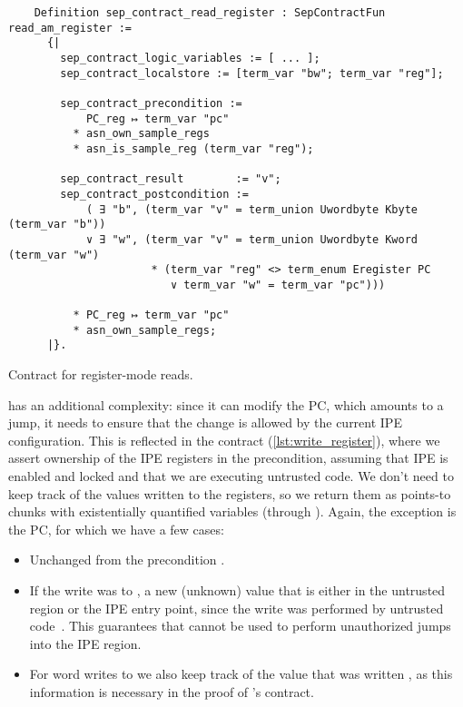 \begin{listing}
  \begin{verbatim}
    Definition sep_contract_read_register : SepContractFun read_am_register :=
      {|
        sep_contract_logic_variables := [ ... ];
        sep_contract_localstore := [term_var "bw"; term_var "reg"];

        sep_contract_precondition :=
            PC_reg ↦ term_var "pc"
          * asn_own_sample_regs
          * asn_is_sample_reg (term_var "reg");

        sep_contract_result        := "v";
        sep_contract_postcondition :=
            ( ∃ "b", (term_var "v" = term_union Uwordbyte Kbyte (term_var "b"))
            ∨ ∃ "w", (term_var "v" = term_union Uwordbyte Kword (term_var "w")
                      * (term_var "reg" <> term_enum Eregister PC
                         ∨ term_var "w" = term_var "pc")))

          * PC_reg ↦ term_var "pc"
          * asn_own_sample_regs;
      |}.
  \end{verbatim}
  \caption{Contract for register-mode reads.}
  \label{lst:read_register}
\end{listing}

 has an additional complexity: since it can modify the PC, which amounts to a jump, it needs to ensure that the change is allowed by the current IPE configuration. This is reflected in the contract (\cref{lst:write_register}), where we assert ownership of the IPE registers in the precondition, assuming that IPE is enabled and locked and that we are executing untrusted code. We don't need to keep track of the values written to the registers, so we return them as points-to chunks with existentially quantified variables (through ). Again, the exception is the PC, for which we have a few cases:
\begin{itemize}
\item Unchanged from the precondition .
\item If the write was to , a new (unknown) value that is either in the untrusted region or the IPE entry point, since the write was performed by untrusted code~. This guarantees that  cannot be used to perform unauthorized jumps into the IPE region.
\item For word writes to  we also keep track of the value that was written , as this information is necessary in the proof of 's contract.
\end{itemize}

